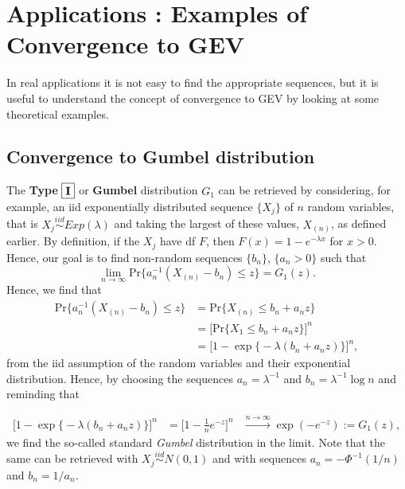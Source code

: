 \section{Applications : Examples of Convergence to GEV}\label{sec::appconcrete}

In real applications it is not easy to find the appropriate sequences, but it is useful to understand the concept of convergence to GEV by looking at some theoretical examples.


\subsection*{Convergence to Gumbel distribution}
The \textbf{Type}  $\boxed{\textbf{\text{I}}}$ or \textbf{Gumbel} distribution $G_1$ can be retrieved by considering, for example, an iid exponentially distributed sequence $\{X_j\}$ of $n$ random variables, that is $X_j\stackrel{iid}{\sim}Exp(\lambda)$ and taking the largest of these values, $X_{(n)}$, as defined earlier. By definition, if the $X_j$ have df $F$, then $F(x)=1-e^{-\lambda x}$ for $x>0$. Hence, our goal is to find non-random sequences $\{b_n\}$, $\{a_n>0\}$ such that 
\begin{equation}
\displaystyle{\lim_{n \to \infty}}\text{Pr}\Big\{ a_n^{-1}(X_{(n)}-b_n)\leq z\Big\}=G_1(z).
\end{equation}
Hence, we find that
\begin{equation*}
\begin{aligned}
\text{Pr}\Big\{ a_n^{-1}(X_{(n)}-b_n)\leq z\Big\}
&=\text{Pr}\big\{X_{(n)}\leq b_n+a_nz\big\} \\ &=\Big[\text{Pr}\{X_1\leq b_n+a_nz\}\Big]^n \\
&=\Big[1-\exp\big\{-\lambda(b_n+a_nz)\big\}\Big]^n,
\end{aligned}
\end{equation*}
from the iid assumption of the random variables and their exponential distribution.
Hence, by choosing  the sequences $a_n=\lambda^{-1}$ and $b_n=\lambda^{-1}\log n$ and reminding that%


\begin{equation*}
\begin{aligned}
\Big[1-\exp\big\{-\lambda(b_n+a_nz)\big\}\Big]^n 
& = \Big[1-\frac{1}{n}e^{-z}\Big]^n %
& \stackrel{n\to\infty}{\longrightarrow} \exp(-e^{-z}):=G_1(z),
\end{aligned}
\end{equation*}
we find the so-called standard \emph{Gumbel} distribution in the limit. 
Note that the same can be retrieved with $X_j\stackrel{iid}{\sim}N(0,1)$ and with sequences $a_n=-\Phi^{-1}(1/n)$ and $b_n=1/a_n$. 

